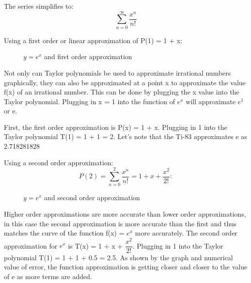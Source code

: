 \documentclass[12pt, titlepage]{article}
\begin{document}
The series simplifies to:
\begin{equation}
  \sum_{n=0}^{\infty} \frac{x^{n}}{n!}
\end{equation}

\pagebreak
Using a first order or linear approximation of P(1) = 1 + x:
\begin{figure}[H]
\centering
    \caption[]{\(y=e^x\) and first order approximation}
\end{figure}

Not only can Taylor polynomials be used to approximate irrational numbers graphically, they can also be approximated at a point x to approximate the value f(x) of an irrational number. This can be done by plugging the x value into the Taylor polynomial. Plugging in x = 1 into the function of \(e^x\) will  approximate \(e^1\) or e. 

First, the first order approximation is P(x) = 1 + x. Plugging in 1 into the Taylor polynomial T(1) = 1 + 1 = 2. Let's note that the Ti-83 approximates e as 2.718281828

Using a second order approximation:
\begin{equation}
  P(2) = \sum_{n=0}^{2} \dfrac{x^{n}}{n!} = 1 + x + \dfrac{x^{2}}{2!}:
\end{equation}

\begin{figure}[H]
\centering
    \caption[]{\(y=e^x\) and second order approximation}
\end{figure}

Higher order approximations are more accurate than lower order approximations, in this case the second approximation is more accurate than the first and thus matches the curve of the function f(x) = \(e^{x}\) more accurately. The second order approximation for \(e^{x}\) is T(x) = 1 + x + \(\dfrac{x^2}{2!}\). Plugging in 1 into the Taylor polynomial T(1) = 1 + 1 + 0.5 = 2.5. As shown by the graph and numerical value of error, the function approximation is getting closer and closer to the value of e as more terms are added.
\end{document}
